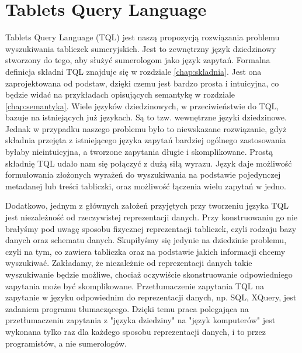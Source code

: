 \section{Tablets Query Language}

Tablets Query Language (TQL) jest naszą propozycją rozwiązania problemu wyszukiwania tabliczek sumeryjskich.
Jest to zewnętrzny język dziedzinowy stworzony do tego, aby służyć sumerologom jako język zapytań.
Formalna definicja składni TQL znajduje się w rozdziale \ref{chap:skladnia}.
Jest ona zaprojektowana od podstaw, dzięki czemu jest bardzo prosta i intuicyjna, co będzie widać na przykładach opisujących semantykę w rozdziale \ref{chap:semantyka}. 
Wiele języków dziedzinowych, w przeciwieństwie do TQL, bazuje na istniejących już językach. Są to tzw. wewnętrzne języki dziedzinowe. Jednak w przypadku naszego problemu było to niewskazane rozwiązanie, gdyż składnia przejęta z istniejącego języka zapytań bardziej ogólnego zastosowania byłaby nieintuicyjna, a tworzone zapytania długie i skomplikowane.
Prostą składnię TQL udało nam się połączyć z dużą siłą wyrazu. Język daje możliwość formułowania złożonych 
wyrażeń do wyszukiwania na podstawie pojedynczej
metadanej lub treści tabliczki, oraz możliwość łączenia wielu zapytań w jedno.

Dodatkowo, jednym z głównych założeń przyjętych przy tworzeniu języka TQL jest niezależność od rzeczywistej
reprezentacji danych. Przy konstruowaniu go nie brałyśmy pod uwagę sposobu fizycznej reprezentacji tabliczek,
czyli rodzaju bazy danych oraz schematu danych. Skupiłyśmy się jedynie na dziedzinie problemu, czyli na tym,
co zawiera tabliczka oraz na podstawie jakich informacji chcemy wyszukiwać. Zakładamy, że niezależnie od
reprezentacji danych takie wyszukiwanie będzie możliwe, chociaż oczywiście skonstruowanie odpowiedniego
zapytania może być skomplikowane. Przetłumaczenie zapytania TQL na zapytanie w języku odpowiednim do
reprezentacji danych, np. SQL, XQuery, jest zadaniem programu tłumaczącego. Dzięki temu praca polegająca
na przetłumaczeniu zapytania z "języka dziedziny" na "język komputerów" jest wykonana tylko raz dla każdego
sposobu reprezentacji danych, i to przez programistów, a nie sumerologów.

